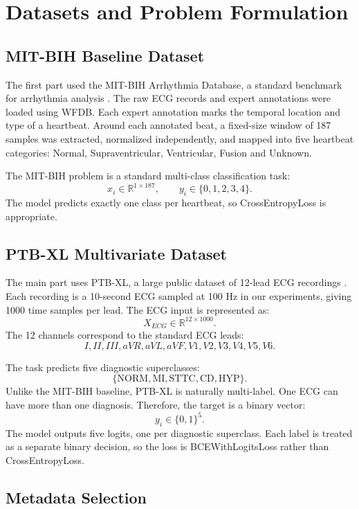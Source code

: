 \documentclass[11pt,a4paper]{article}
\begin{document}
\section{Datasets and Problem Formulation}

\subsection{MIT-BIH Baseline Dataset}

The first part used the MIT-BIH Arrhythmia Database, a standard benchmark for arrhythmia analysis \cite{moody2001mitdb,goldberger2000physiobank}. The raw ECG records and expert annotations were loaded using WFDB. Each expert annotation marks the temporal location and type of a heartbeat. Around each annotated beat, a fixed-size window of 187 samples was extracted, normalized independently, and mapped into five heartbeat categories: Normal, Supraventricular, Ventricular, Fusion and Unknown.

The MIT-BIH problem is a standard multi-class classification task:
\[
    x_i \in \mathbb{R}^{1 \times 187}, \qquad y_i \in \{0,1,2,3,4\}.
\]
The model predicts exactly one class per heartbeat, so CrossEntropyLoss is appropriate.

\subsection{PTB-XL Multivariate Dataset}

The main part uses PTB-XL, a large public dataset of 12-lead ECG recordings \cite{wagner2020ptbxl}. Each recording is a 10-second ECG sampled at 100 Hz in our experiments, giving 1000 time samples per lead. The ECG input is represented as:
\[
    X_{ECG} \in \mathbb{R}^{12 \times 1000}.
\]
The 12 channels correspond to the standard ECG leads:
\[
    I, II, III, aVR, aVL, aVF, V1, V2, V3, V4, V5, V6.
\]

The task predicts five diagnostic superclasses:
\[
    \{\text{NORM}, \text{MI}, \text{STTC}, \text{CD}, \text{HYP}\}.
\]
Unlike the MIT-BIH baseline, PTB-XL is naturally multi-label. One ECG can have more than one diagnosis. Therefore, the target is a binary vector:
\[
    y_i \in \{0,1\}^{5}.
\]
The model outputs five logits, one per diagnostic superclass. Each label is treated as a separate binary decision, so the loss is BCEWithLogitsLoss rather than CrossEntropyLoss.

\subsection{Metadata Selection}
\end{document}
